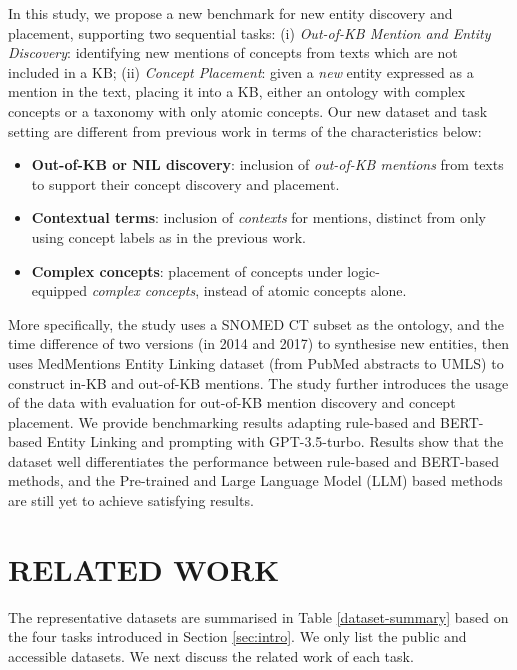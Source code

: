 \documentclass[sigconf]{acmart}
\begin{document}
	In this study, we propose a new benchmark for new entity discovery and placement, supporting two sequential tasks: (i) \textit{Out-of-KB Mention and Entity Discovery}: identifying new mentions of concepts from texts which are not included in a KB; (ii) \textit{Concept Placement}: given a \textit{new} entity expressed as a mention in the text, placing it into a KB, either an ontology with complex concepts or a taxonomy with only atomic concepts. Our new dataset and task setting are different from previous work in terms of the characteristics below:
	
	\begin{itemize}
		\item \textbf{Out-of-KB or NIL discovery}: inclusion of \textit{out-of-KB mentions} from texts to support their concept discovery and placement.
		\item \textbf{Contextual terms}: inclusion of \textit{contexts} for mentions, distinct from only using concept labels as in the previous work.
		\item \textbf{Complex concepts}: placement of concepts under logic-\\equipped \textit{complex concepts}, instead of atomic concepts alone.
	\end{itemize}
	
	More specifically, the study uses a SNOMED CT subset as the ontology, and the time difference of two versions (in 2014 and 2017) to synthesise new entities, then uses MedMentions Entity Linking dataset \cite{Mohan2019medmentions} (from PubMed abstracts to UMLS) to construct in-KB and out-of-KB mentions. The study further introduces the usage of the data with evaluation for out-of-KB mention discovery and concept placement. We provide benchmarking results adapting rule-based and BERT-based Entity Linking \cite{dong2023NIL,wu2020blink} and prompting with GPT-3.5-turbo. Results show that the dataset well differentiates the performance between rule-based and BERT-based methods, and the
	Pre-trained and Large Language Model (LLM) based methods are still yet to achieve satisfying results.
	
	\section{RELATED WORK}
	The representative datasets are summarised in Table \ref{dataset-summary} based on the four tasks introduced in Section \ref{sec:intro}. We only list the public and accessible datasets. We next discuss the related work of each task.
	
\end{document}
